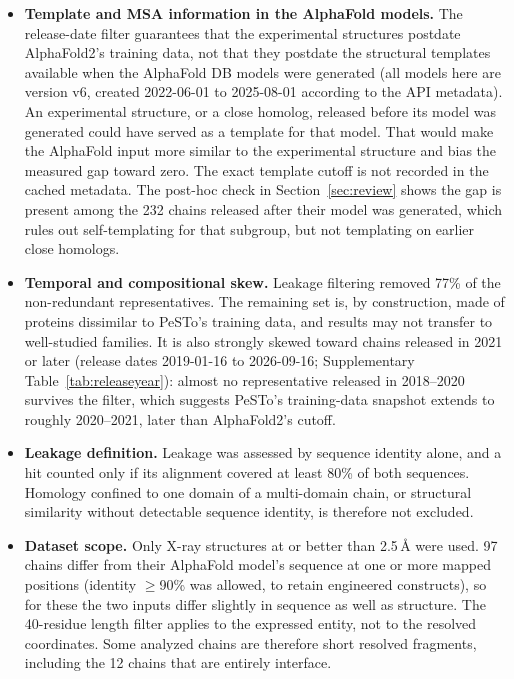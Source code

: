 \documentclass[10pt]{article}
\begin{document}
\begin{itemize}[nosep,leftmargin=1.4em]
\item \textbf{Template and MSA information in the AlphaFold models.} The
release-date filter guarantees that the experimental structures postdate
AlphaFold2's training data, not that they postdate the structural templates
available when the AlphaFold DB models were generated (all models here are
version v6, created 2022-06-01 to 2025-08-01 according
to the API metadata). An experimental structure, or a close homolog,
released before its model was generated could have served as a template for
that model. That would make the AlphaFold input more similar to the
experimental structure and bias the measured gap toward zero. The exact
template cutoff is not recorded in the cached metadata. The post-hoc check
in Section~\ref{sec:review} shows the gap is present among the
232 chains released after their model was generated, which rules
out self-templating for that subgroup, but not templating on earlier close
homologs.
\item \textbf{Temporal and compositional skew.} Leakage filtering removed
77\% of the non-redundant representatives. The remaining set is,
by construction, made of proteins dissimilar to PeSTo's training data, and
results may not transfer to well-studied families. It is also strongly
skewed toward chains released in 2021 or later (release dates
2019-01-16 to 2026-09-16; Supplementary Table~\ref{tab:releaseyear}):
almost no representative released in 2018--2020 survives the filter, which
suggests PeSTo's training-data snapshot extends to roughly 2020--2021, later
than AlphaFold2's cutoff.
\item \textbf{Leakage definition.} Leakage was assessed by sequence identity
alone, and a hit counted only if its alignment covered at least
80\% of both sequences. Homology confined to one domain
of a multi-domain chain, or structural similarity without detectable
sequence identity, is therefore not excluded.
\item \textbf{Dataset scope.} Only X-ray structures at or better than
2.5\,\r{A} were used. 97 chains differ from
their AlphaFold model's sequence at one or more mapped positions (identity
$\geq$90\% was allowed, to retain engineered
constructs), so for these the two inputs differ slightly in sequence as well
as structure. The 40-residue length filter applies to the
expressed entity, not to the resolved coordinates. Some analyzed chains are
therefore short resolved fragments, including the 12 chains that
are entirely interface.

\end{itemize}
\end{document}
